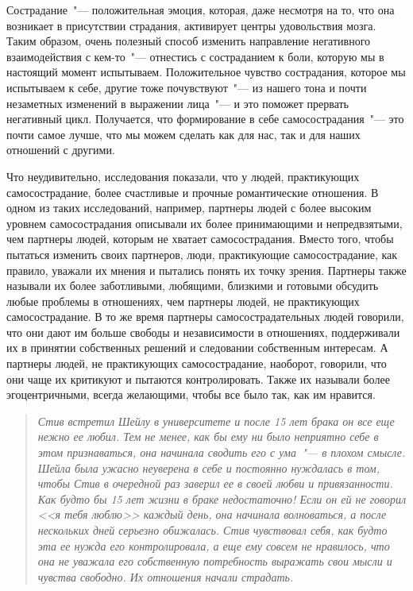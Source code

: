 Сострадание~"--- положительная эмоция, которая, даже несмотря на то, что она возникает в присутствии страдания, активирует центры удовольствия мозга\cite{96}. Таким образом, очень полезный способ изменить направление негативного взаимодействия с кем-то~"--- отнестись с состраданием к боли, которую мы в настоящий момент испытываем. Положительное чувство сострадания, которое мы испытываем к себе, другие тоже почувствуют~"--- из нашего тона и почти незаметных изменений в выражении лица~"--- и это поможет прервать негативный цикл. Получается, что формирование в себе самосострадания~"--- это почти самое лучше, что мы можем сделать как для нас, так и для наших отношений с другими. 

Что неудивительно, исследования показали, что у людей, практикующих самосострадание, более счастливые и прочные романтические отношения\cite{97}. В одном из таких исследований, например, партнеры людей с более высоким уровнем самосострадания описывали их более принимающими и непредвзятыми, чем партнеры людей, которым не хватает самосострадания. Вместо того, чтобы пытаться изменить своих партнеров, люди, практикующие самосострадание, как правило, уважали их мнения и пытались понять их точку зрения. Партнеры также называли их более заботливыми, любящими, близкими и готовыми обсудить любые проблемы в отношениях, чем партнеры людей, не практикующих самосострадание. В то же время партнеры самосострадательных людей говорили, что они дают им больше свободы и независимости в отношениях, поддерживали их в принятии собственных решений и следовании собственным интересам. А партнеры людей, не практикующих самосострадание, наоборот, говорили, что они чаще их критикуют и пытаются контролировать. Также их называли более эгоцентричными, всегда желающими, чтобы все было так, как им нравится. 

\begin{quotation}
	\textit{
		Стив встретил Шейлу в университете и после 15 лет брака он все еще нежно ее любил. Тем не менее, как бы ему ни было неприятно себе в этом признаваться, она начинала сводить его с ума~"--- в плохом смысле. Шейла была ужасно неуверена в себе и постоянно нуждалась в том, чтобы Стив в очередной раз заверил ее в своей любви и привязанности. Как будто бы 15 лет жизни в браке недостаточно! Если он ей не говорил <<я тебя люблю>> каждый день, она начинала волноваться, а после нескольких дней серьезно обижалась. Стив чувствовал себя, как будто эта ее нужда его контролировала, а еще ему совсем не нравилось, что она не уважала его собственную потребность выражать свои мысли и чувства свободно. Их отношения начали страдать.
	}
\end{quotation}

